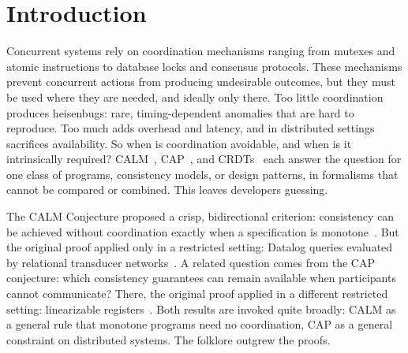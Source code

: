 \documentclass[sigconf]{cidr-2027}
\theoremstyle{remark}
\begin{document}

\maketitle
{}\par\medskip

\section{Introduction}
\label{sec:intro}

Concurrent systems rely on coordination mechanisms ranging from mutexes and
atomic instructions to database locks and consensus protocols.  These mechanisms
prevent concurrent actions from producing undesirable outcomes, but they must be
used where they are needed, and ideally only there.  Too little coordination
produces heisenbugs: rare, timing-dependent anomalies that are hard to
reproduce.  Too much adds overhead and latency, and in distributed settings
sacrifices availability.  So when is coordination avoidable, and when is it
intrinsically required?  CALM~\cite{ameloot2013relational},
CAP~\cite{gilbert2002cap}, and CRDTs~\cite{shapiro2011crdt} each answer the
question for one class of programs, consistency models, or design patterns, in
formalisms that cannot be compared or combined.  This leaves developers
guessing.

The CALM Conjecture proposed a crisp, bidirectional criterion:
consistency can be achieved without coordination exactly when a specification
is monotone~\cite{hellerstein2010declarative}.  But the original proof applied
only in a restricted setting: Datalog queries evaluated by relational transducer
networks~\cite{ameloot2013relational,hellerstein2020keeping}. A related
question comes from the CAP conjecture: which consistency guarantees can remain
available when participants cannot communicate? There, the original proof
applied in a different restricted setting: linearizable
registers~\cite{brewer2000towards,gilbert2002cap}.  Both results are invoked
quite broadly: CALM as a general rule that monotone programs need no
coordination, CAP as a general constraint on distributed systems. The folklore
outgrew the proofs.
\end{document}
